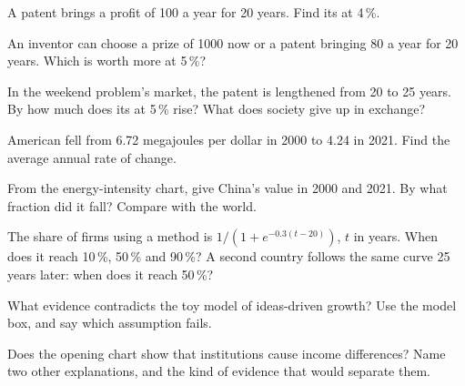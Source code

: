 \begin{exercise}[$\star\star$]\label{exo:g12:ideas-institutions-growth:6}
A patent brings a profit of 100 a year for 20 years. Find its  at 4\,\%.
\end{exercise}

\begin{exercise}[$\star\star$]\label{exo:g12:ideas-institutions-growth:7}
An inventor can choose a prize of 1000 now or a patent bringing 80 a year for 20 years. Which is worth more at 5\,\%?
\end{exercise}

\begin{exercise}[$\star\star$]\label{exo:g12:ideas-institutions-growth:8}
In the weekend problem's market, the patent is lengthened from 20 to 25 years. By how much does its  at 5\,\% rise? What does society give up in exchange?
\end{exercise}

\begin{exercise}[$\star\star$]\label{exo:g12:ideas-institutions-growth:9}
American  fell from 6.72 megajoules per dollar in 2000 to 4.24 in 2021. Find the average annual rate of change.
\end{exercise}

\begin{exercise}[$\star\star$]\label{exo:g12:ideas-institutions-growth:10}
From the energy-intensity chart, give China's value in 2000 and 2021. By what fraction did it fall? Compare with the world.
\end{exercise}

\begin{exercise}[$\star\star$]\label{exo:g12:ideas-institutions-growth:11}
The share of firms using a method is $1/(1 + e^{-0.3(t - 20)})$, $t$ in years. When does it reach 10\,\%, 50\,\% and 90\,\%? A second country follows the same curve 25 years
later: when does it reach 50\,\%?
\end{exercise}

\begin{exercise}[$\star\star\star$]\label{exo:g12:ideas-institutions-growth:12}
What evidence contradicts the toy model of ideas-driven growth? Use the model box, and say which assumption fails.
\end{exercise}

\begin{exercise}[$\star\star\star$]\label{exo:g12:ideas-institutions-growth:13}
Does the opening chart show that institutions cause income differences? Name two other explanations, and the kind of evidence that would separate them.
\end{exercise}

